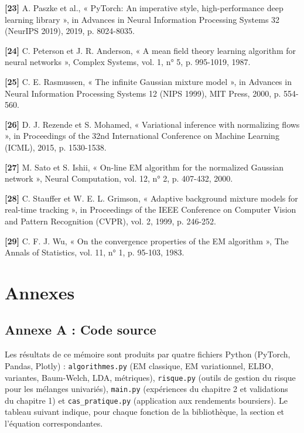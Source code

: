 \textbf{[23]  }A. Paszke et al., « PyTorch: An imperative style, high-performance deep learning library », in Advances in Neural Information Processing Systems 32 (NeurIPS 2019), 2019, p. 8024-8035.

\textbf{[24]  }C. Peterson et J. R. Anderson, « A mean field theory learning algorithm for neural networks », Complex Systems, vol. 1, n° 5, p. 995-1019, 1987.

\textbf{[25]  }C. E. Rasmussen, « The infinite Gaussian mixture model », in Advances in Neural Information Processing Systems 12 (NIPS 1999), MIT Press, 2000, p. 554-560.

\textbf{[26]  }D. J. Rezende et S. Mohamed, « Variational inference with normalizing flows », in Proceedings of the 32nd International Conference on Machine Learning (ICML), 2015, p. 1530-1538.

\textbf{[27]  }M. Sato et S. Ishii, « On-line EM algorithm for the normalized Gaussian network », Neural Computation, vol. 12, n° 2, p. 407-432, 2000.

\textbf{[28]  }C. Stauffer et W. E. L. Grimson, « Adaptive background mixture models for real-time tracking », in Proceedings of the IEEE Conference on Computer Vision and Pattern Recognition (CVPR), vol. 2, 1999, p. 246-252.

\textbf{[29]  }C. F. J. Wu, « On the convergence properties of the EM algorithm », The Annals of Statistics, vol. 11, n° 1, p. 95-103, 1983.


\chapter*{Annexes}
\section*{Annexe A : Code source}
Les résultats de ce mémoire sont produits par quatre fichiers Python (PyTorch, Pandas, Plotly) : \texttt{algorithmes.py} (EM classique, EM variationnel, ELBO, variantes, Baum-Welch, LDA, métriques), \texttt{risque.py} (outils de gestion du risque pour les mélanges univariés), \texttt{main.py} (expériences du chapitre 2 et validations du chapitre 1) et \texttt{cas\_pratique.py} (application aux rendements boursiers). Le tableau suivant indique, pour chaque fonction de la bibliothèque, la section et l'équation correspondantes.

